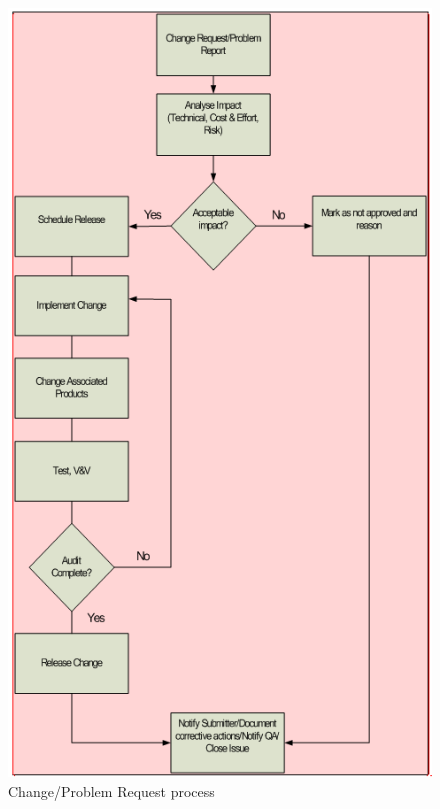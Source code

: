 \documentclass{template/openetcs_article}
\begin{document}
 
\begin{figure}
\centering
\includegraphics[scale=1.3]{./figures/changerequest.PNG}
\caption{Change/Problem Request process}
\end{figure}
\end{document}
